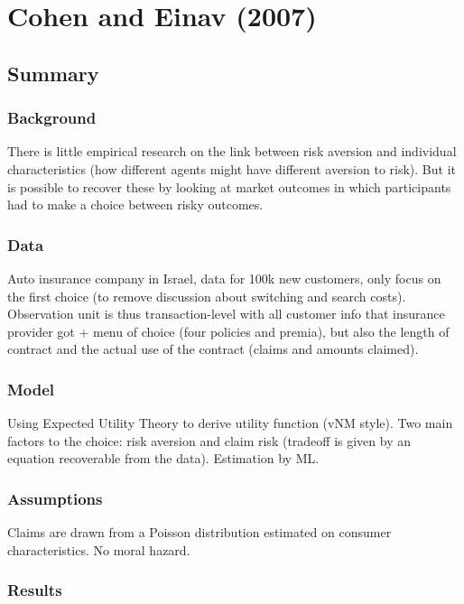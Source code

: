 \section{Cohen and Einav (2007)}

\subsection{Summary}

\subsubsection{Background}

There is little empirical research on the link between risk aversion and individual characteristics (how different agents might have different aversion to risk). But it is possible to recover these by looking at market outcomes in which participants had to make a choice between risky outcomes.

\subsubsection{Data}

Auto insurance company in Israel, data for 100k new customers, only focus on the first choice (to remove discussion about switching and search costs). Observation unit is thus transaction-level with all customer info that insurance provider got + menu of choice (four policies and premia), but also the length of contract and the actual use of the contract (claims and amounts claimed).

\subsubsection{Model}

Using Expected Utility Theory to derive utility function (vNM style). Two main factors to the choice: risk aversion and claim risk (tradeoff is given by an equation recoverable from the data). Estimation by ML.

\subsubsection{Assumptions}

Claims are drawn from a Poisson distribution estimated on consumer characteristics. No moral hazard.

\subsubsection{Results}

